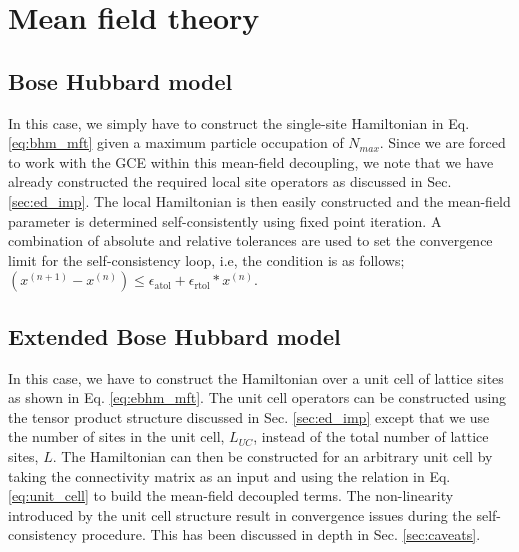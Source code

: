 \section{Mean field theory}

\subsection{Bose Hubbard model}
In this case, we simply have to construct the single-site Hamiltonian in Eq. \eqref{eq:bhm_mft} given a maximum particle occupation of $N_{max}$. Since we are forced to work with the GCE within this mean-field decoupling, we note that we have already constructed the required local site operators as discussed in Sec. \ref{sec:ed_imp}. The local Hamiltonian is then easily constructed and the mean-field parameter is determined self-consistently using fixed point iteration. A combination of absolute and relative tolerances are used to set the convergence limit for the self-consistency loop, i.e, the condition is as follows; $(x^{(n + 1)} - x^{(n)})  \leq \epsilon_{\text{atol}} + \epsilon_{\text{rtol}} * x^{(n)}$. 

\subsection{Extended Bose Hubbard model}
In this case, we have to construct the Hamiltonian over a unit cell of lattice sites as shown in Eq. \eqref{eq:ebhm_mft}. The unit cell operators can be constructed using the tensor product structure discussed in Sec. \ref{sec:ed_imp} except that we use the number of sites in the unit cell, $L_{UC}$, instead of the total number of lattice sites, $L$. The Hamiltonian can then be constructed for an arbitrary unit cell by taking the connectivity matrix as an input and using the relation in Eq. \eqref{eq:unit_cell} to build the mean-field decoupled terms. The non-linearity introduced by the unit cell structure result in convergence issues during the self-consistency procedure. This has been discussed in depth in Sec. \ref{sec:caveats}.

